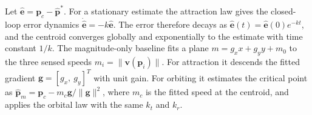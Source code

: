 Let $\hat{\mathbf{e}} = \mathbf{p}_c - \hat{\mathbf{p}}^*$. For a stationary estimate the attraction law gives the closed-loop error dynamics $\dot{\hat{\mathbf{e}}} = -k\hat{\mathbf{e}}$. The error therefore decays as $\hat{\mathbf{e}}(t) = \hat{\mathbf{e}}(0)e^{-kt}$, and the centroid converges globally and exponentially to the estimate with time constant $1/k$.
%
The magnitude-only baseline fits a plane $m = g_x x + g_y y + m_0$ to the three sensed speeds $m_i = \|\mathbf{v}(\mathbf{p}_i)\|$. For attraction it descends the fitted gradient $\mathbf{g} = [g_x,\ g_y]^T$ with unit gain. For orbiting it estimates the critical point as $\hat{\mathbf{p}}_m = \mathbf{p}_c - m_c\mathbf{g}/\|\mathbf{g}\|^2$, where $m_c$ is the fitted speed at the centroid, and applies the orbital law with the same $k_t$ and $k_r$.
%
